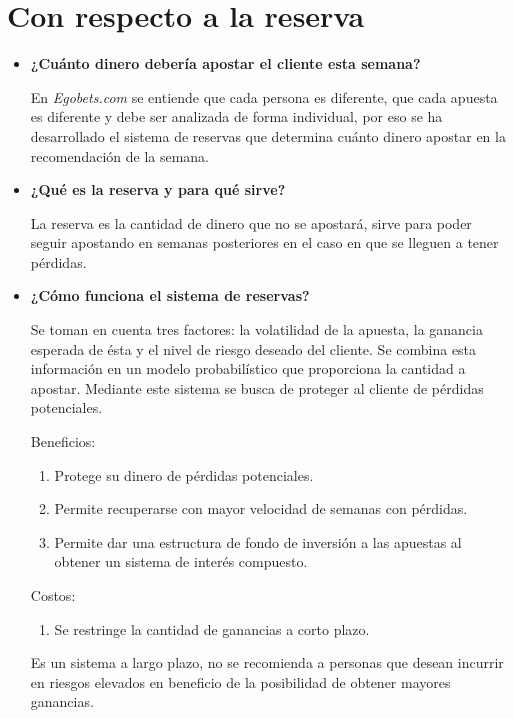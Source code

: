 \section{Con respecto a la reserva}
\begin{itemize}

\item \textbf{¿Cuánto dinero debería apostar el cliente esta semana?}


En \emph{Egobets.com} se entiende que cada persona es diferente, que cada apuesta es diferente y debe ser analizada de forma individual, por eso se ha desarrollado el sistema de reservas que determina cuánto dinero apostar en la recomendación de la semana.

\item \textbf{¿Qué es la reserva y para qué sirve?}


La reserva es la cantidad de dinero que no se apostará, sirve para poder seguir apostando en semanas posteriores en el caso en que se lleguen a tener pérdidas.

\item \textbf{¿Cómo funciona el sistema de reservas?}


Se toman en cuenta tres factores: la volatilidad de la apuesta, la ganancia esperada de ésta y el nivel de riesgo deseado del cliente. Se combina esta información en un modelo probabilístico que proporciona la cantidad a apostar. Mediante este sistema se busca de proteger al cliente de pérdidas potenciales.

Beneficios:
\begin{enumerate}

	\item Protege su dinero de pérdidas potenciales.
	\item Permite recuperarse con mayor velocidad de semanas con pérdidas.
	\item Permite dar una estructura de fondo de inversión a las apuestas al obtener un sistema de interés compuesto.

\end{enumerate}

Costos:
\begin{enumerate}
	\item Se restringe la cantidad de ganancias a corto plazo.
\end{enumerate}

Es un sistema a largo plazo, no se recomienda a personas que desean incurrir en riesgos elevados en beneficio de la posibilidad de obtener mayores ganancias.

\end{itemize}

